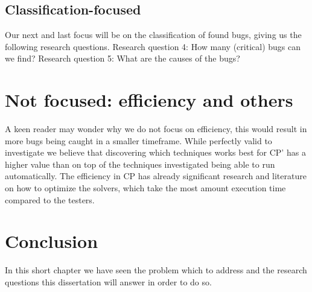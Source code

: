 
\subsection{Classification-focused}
Our next and last focus will be on the classification of found bugs, giving us the following research questions. \newline
Research question 4: How many (critical) bugs can we find? \newline
Research question 5: What are the causes of the bugs? \newline

\section{Not focused: efficiency and others}
A keen reader may wonder why we do not focus on efficiency, this would result in more bugs being caught in a smaller timeframe. While perfectly valid to investigate we believe that discovering which techniques works best for CP' has a higher value than on top of the techniques investigated being able to run automatically. The efficiency in CP has already significant research and literature on how to optimize the solvers, which take the most amount execution time compared to the testers.


\section{Conclusion}
\label{RQ:conclusion}
In this short chapter we have seen the problem which to address and the research questions this dissertation will answer in order to do so.

